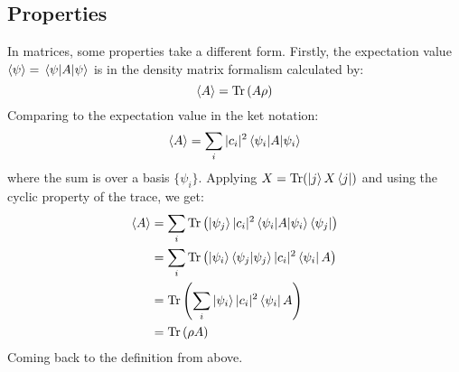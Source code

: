 \subsection{Properties}
In matrices, some properties take a different form. Firstly, the expectation value $\expval{\psi} = \mel{\psi}{A}{\psi}$ is in the density matrix formalism calculated by:
\begin{equation}
    \expval{A} = \Tr \left(A\rho\right)
\end{equation}
Comparing to the expectation value in the ket notation:
\begin{equation}
    \expval{A}= \sum_i |c_i|^2 \mel{\psi_i}{A}{\psi_i}
\end{equation}
where the sum is over a basis $\{\psi_i\}$. Applying $X = \Tr(\ket{j}X\bra{j})$ and using the cyclic property of the trace, we get:
\begin{align}
    \expval{A}  &= \sum_i \Tr\left(\ket{\psi_j}|c_i|^2 \mel{\psi_i}{A}{\psi_i}\bra{\psi_j}\right) \\
                &= \sum_i \Tr\left(\ket{\psi_i}\bra{\psi_j}\ket{\psi_j}|c_i|^2 \bra{\psi_i}{A}\right) \\
                &=  \Tr\left( \sum_i \ket{\psi_i}|c_i|^2 \bra{\psi_i}{A}\right) \\
                &= \Tr\left(\rho A\right) \\
\end{align}
Coming back to the definition from above. 



